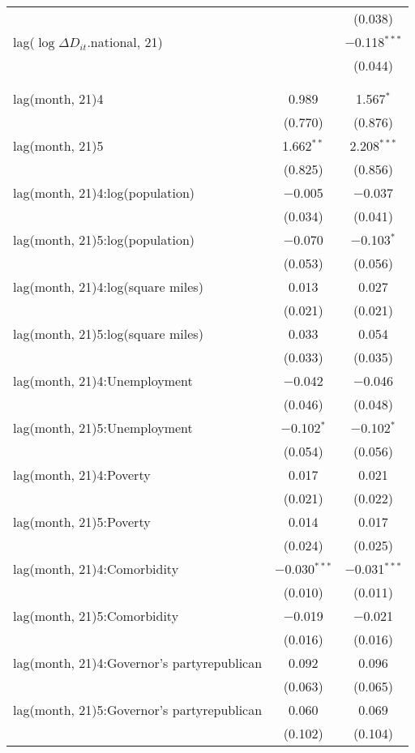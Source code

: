 \begin{tabular}{@{\extracolsep{1pt}}lcc}
  &  & (0.038) \\ 
  lag($\log \Delta D_{it}$.national, 21) &  & $-$0.118$^{***}$ \\ 
  &  & (0.044) \\ 
   &  &  \\ 
  &  &  \\ 
  lag(month, 21)4 & 0.989 & 1.567$^{*}$ \\ 
  & (0.770) & (0.876) \\ 
  lag(month, 21)5 & 1.662$^{**}$ & 2.208$^{***}$ \\ 
  & (0.825) & (0.856) \\ 
  lag(month, 21)4:log(population) & $-$0.005 & $-$0.037 \\ 
  & (0.034) & (0.041) \\ 
  lag(month, 21)5:log(population) & $-$0.070 & $-$0.103$^{*}$ \\ 
  & (0.053) & (0.056) \\ 
  lag(month, 21)4:log(square miles) & 0.013 & 0.027 \\ 
  & (0.021) & (0.021) \\ 
  lag(month, 21)5:log(square miles) & 0.033 & 0.054 \\ 
  & (0.033) & (0.035) \\ 
  lag(month, 21)4:Unemployment & $-$0.042 & $-$0.046 \\ 
  & (0.046) & (0.048) \\ 
  lag(month, 21)5:Unemployment & $-$0.102$^{*}$ & $-$0.102$^{*}$ \\ 
  & (0.054) & (0.056) \\ 
  lag(month, 21)4:Poverty & 0.017 & 0.021 \\ 
  & (0.021) & (0.022) \\ 
  lag(month, 21)5:Poverty & 0.014 & 0.017 \\ 
  & (0.024) & (0.025) \\ 
  lag(month, 21)4:Comorbidity & $-$0.030$^{***}$ & $-$0.031$^{***}$ \\ 
  & (0.010) & (0.011) \\ 
  lag(month, 21)5:Comorbidity & $-$0.019 & $-$0.021 \\ 
  & (0.016) & (0.016) \\ 
  lag(month, 21)4:Governor's partyrepublican & 0.092 & 0.096 \\ 
  & (0.063) & (0.065) \\ 
  lag(month, 21)5:Governor's partyrepublican & 0.060 & 0.069 \\ 
  & (0.102) & (0.104) \\ 

\end{tabular}
